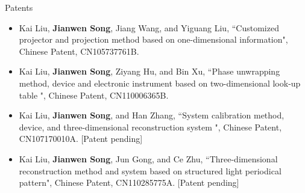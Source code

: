 \documentclass{resume} %
\begin{document}
\begin{rSection}{Patents}
\begin{itemize}[leftmargin=*]
	\item Kai Liu, {\bf Jianwen Song}, Jiang Wang, and Yiguang Liu, ``Customized projector and projection method based on one-dimensional information", Chinese Patent, CN105737761B.
	\item Kai Liu, {\bf Jianwen Song}, Ziyang Hu, and Bin Xu, ``Phase unwrapping method, device and electronic instrument based on two-dimensional look-up table ", Chinese Patent, CN110006365B.
	\item Kai Liu, {\bf Jianwen Song}, and Han Zhang, ``System calibration method, device, and three-dimensional reconstruction system ", Chinese Patent, CN107170010A. [Patent pending]
	\item Kai Liu, {\bf Jianwen Song}, Jun Gong, and Ce Zhu, ``Three-dimensional reconstruction method and system based on structured light periodical pattern", Chinese Patent, CN110285775A. [Patent pending]
\end{itemize}
	
\end{rSection}

\end{document}
